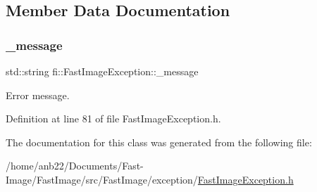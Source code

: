 \subsection{Member Data Documentation}
\mbox{\label{classfi_1_1FastImageException_aae758858090a83245d8bd58fd86aab6e}} 
\subsubsection{\texorpdfstring{\+\_\+message}{\_message}}
{\footnotesize\ttfamily std\+::string fi\+::\+Fast\+Image\+Exception\+::\+\_\+message\hspace{0.3cm}{\ttfamily [private]}}



Error message. 



Definition at line 81 of file Fast\+Image\+Exception.\+h.



The documentation for this class was generated from the following file\+:\begin{DoxyCompactItemize}
\item 
/home/anb22/\+Documents/\+Fast-\/\+Image/\+Fast\+Image/src/\+Fast\+Image/exception/\hyperlink{FastImageException_8h}{Fast\+Image\+Exception.\+h}\end{DoxyCompactItemize}
